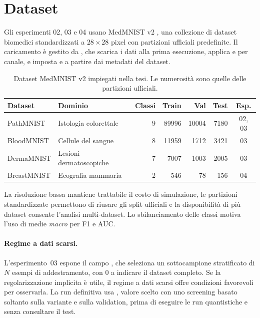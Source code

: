 \section{Dataset}
\label{sec:dataset}

Gli esperimenti 02, 03 e 04 usano MedMNIST v2 \parencite{yang2023medmnist}, una
collezione di dataset biomedici standardizzati a $28\times28$ pixel con partizioni
ufficiali predefinite. Il caricamento è gestito da , che
scarica i dati alla prima esecuzione, applica  e
 per canale, e imposta  e
 a partire dai metadati del dataset.

\begin{table}[htbp]
\centering
\caption[Dataset MedMNIST impiegati]{%
Dataset MedMNIST v2 impiegati nella tesi. Le numerosità sono quelle delle
partizioni ufficiali.}
\label{tab:dataset}
\small
\begin{tabular}{@{}l l r r r r c@{}}
\toprule
\textbf{Dataset} & \textbf{Dominio} & \textbf{Classi} & \textbf{Train} & \textbf{Val} & \textbf{Test} & \textbf{Esp.} \\
\midrule
PathMNIST   & Istologia colorettale       & 9 & \num{89996} & \num{10004} & \num{7180} & 02, 03 \\
BloodMNIST  & Cellule del sangue          & 8 & \num{11959} & \num{1712}  & \num{3421} & 03 \\
DermaMNIST  & Lesioni dermatoscopiche     & 7 & \num{7007}  & \num{1003}  & \num{2005} & 03 \\
BreastMNIST & Ecografia mammaria          & 2 & \num{546}   & \num{78}    & \num{156}  & 04 \\
\bottomrule
\end{tabular}
\end{table}

La risoluzione bassa mantiene trattabile il costo di simulazione, le partizioni
standardizzate permettono di riusare gli split ufficiali e la disponibilità di più
dataset consente l'analisi multi-dataset. Lo sbilanciamento delle classi motiva
l'uso di medie \emph{macro} per F1 e AUC.

\paragraph{Regime a dati scarsi.} L'esperimento~03 espone il campo
, che seleziona un sottocampione stratificato di $N$ esempi di
addestramento, con $0$ a indicare il dataset completo. Se la regolarizzazione
implicita è utile, il regime a dati scarsi offre condizioni favorevoli per
osservarla. La run definitiva usa , valore scelto con uno
screening basato soltanto sulla variante
 e sulla validation, prima di eseguire le run quantistiche e
senza consultare il test.


